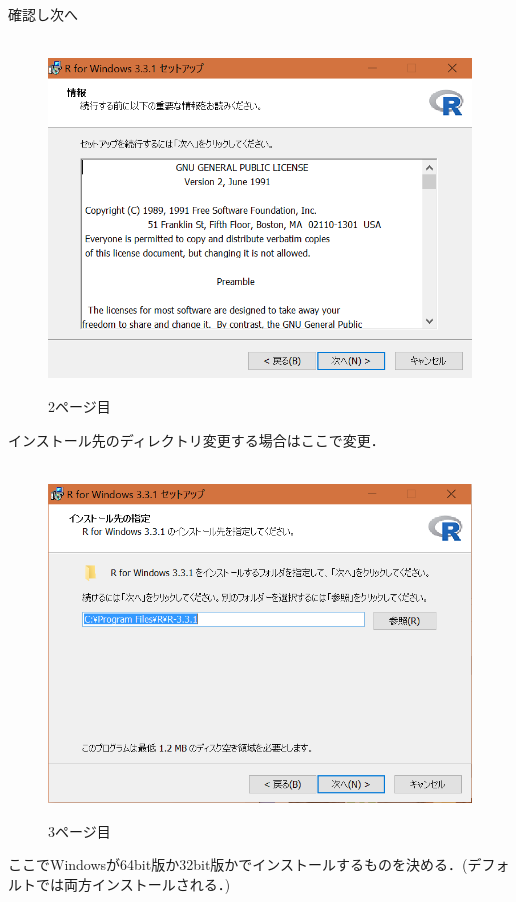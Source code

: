 \newpage
確認し次へ
\begin{figure}[!htbp]
\centering　
\includegraphics[width=13cm]{rinstall2.png}
\caption{2ページ目}
\end{figure}

\newpage

インストール先のディレクトリ変更する場合はここで変更．
\begin{figure}[!htbp]
\centering　
\includegraphics[width=13cm]{rinstall3.png}
\caption{3ページ目}
\end{figure}

\newpage

ここでWindowsが64bit版か32bit版かでインストールするものを決める．(デフォルトでは両方インストールされる．)

